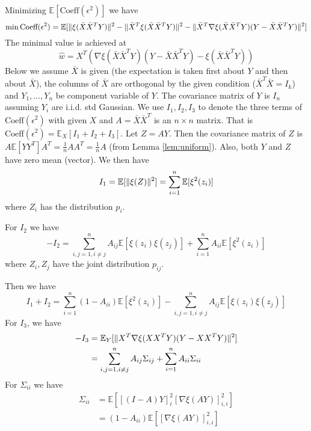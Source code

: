 \documentclass{article}
\DeclarePairedDelimiter\norm{\lVert}{\rVert}
\def\E{\mathbb{E}}
\begin{document}
Minimizing $\E[\textrm{Coeff}(\epsilon^2)]$ we have
\begin{equation}
\min \textrm{Coeff}(\epsilon^2) = \E[\norm{\xi(\bar{X}\bar{X}^TY)}^2 - \norm{\bar{X}^T\xi(\bar{X}\bar{X}^TY)}^2 - \norm{\bar{X}^T \nabla\xi(\bar{X}\bar{X}^TY)(Y-\bar{X}\bar{X}^TY)}^2]
\end{equation}
The minimal value is achieved at 
$$
\hat{w} =  X^T(\nabla\xi(\bar{X}\bar{X}^T Y)
(Y-\bar{X}\bar{X}^T Y) - \xi(\bar{X}\bar{X}^T Y))
$$
Below we assume $\bar{X}$ is given (the expectation is taken first about $Y$ and then about $\bar{X}$), the columns of $\bar{X}$ are orthogonal by the given condition ($\bar{X}^T\bar{X}=I_k$) and $Y_1, \dots, Y_n $ be component variable of $Y$. The covariance matrix of $Y$ is $I_n$ assuming $Y_i$ are i.i.d. std Gaussian. We use $I_1, I_2, I_3$ to denote the three terms of $\textrm{Coeff}(\epsilon^2)$ with given $X$ and $A=\bar{X}\bar{X}^T$ is an $n\times n$ matrix. That is $ \textrm{Coeff}(\epsilon^2) = \E_{X} [I_1 + I_2 + I_3]$.
Let $Z = AY$. Then the covariance matrix of $Z$ is $A\E[YY^T]A^T = \frac{1}{n}AA^T = \frac{1}{n}A$ (from Lemma \ref{lem:uniform}).
Also, both $Y$ and $Z$ have zero mean (vector). We then have
\begin{equation*}
I_1 =\E[\norm{\xi(Z)}^2] = \sum_{i=1}^n \E[\xi^2(z_i)]
\end{equation*}
where $Z_i$ has the distribution $p_i$.
 
For $I_2$
we have
\begin{equation*}
-I_2   = \sum_{i,j=1, i \neq j}^n A_{ij}\E[\xi(z_i)\xi(z_j)] + \sum_{i=1}^n A_{ii}  \E[\xi^2(z_i)]
\end{equation*}
where $Z_i, Z_j$ have the joint distribution $p_{ij}$.

Then we have
\begin{equation}\label{eq:I1plusI2}
I_1+ I_2 =   \sum_{i=1}^n (1-A_{ii}) \E[\xi^2(z_i)]  - \sum_{i,j=1, i \neq j}^n A_{ij}\E[\xi(z_i)\xi(z_j)] 
\end{equation}
For $I_3$, we have
\begin{align*}
-I_3 & = \E_Y[\norm{X^T \nabla\xi(XX^TY)(Y-XX^TY)}^2] \\ 
 & = \sum_{i,j=1, i \neq j}^n A_{ij}\Sigma_{ij} + \sum_{i=1}^n A_{ii}\Sigma_{ii} 
\end{align*}
For $\Sigma_{ii}$ we have
\begin{align}\label{eq:sigmaii}
\Sigma_{ii} &=  \E[ [(I-A)Y]_i^2 [\nabla \xi(AY)]_{i,i}^2] \\
&= (1-A_{ii}) \E[ [\nabla \xi(AY)]_{i,i}^2]
\end{align}
\end{document}
